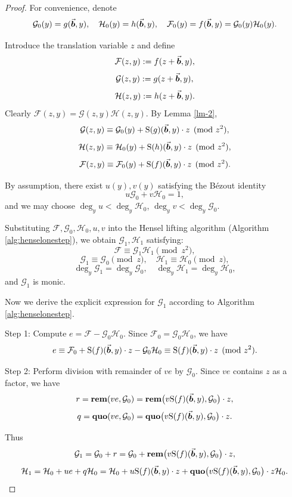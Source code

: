 \documentclass{article}
\numberwithin{equation}{section}
\begin{document}
\begin{proof}
For convenience, denote
\[
\mathcal{G}_0(y) = g(\vec{\boldsymbol{b}}, y), \quad \mathcal{H}_0(y) = h(\vec{\boldsymbol{b}}, y), \quad \mathcal{F}_0(y) = f(\vec{\boldsymbol{b}}, y) = \mathcal{G}_0(y) \mathcal{H}_0(y).
\]

Introduce the translation variable \(z\) and define
\[
\mathcal{F}(z, y) := f(z+\vec{\boldsymbol{b}}, y),
\]
\[
\mathcal{G}(z, y) := g(z+\vec{\boldsymbol{b}}, y),
\]
\[
\mathcal{H}(z, y) := h(z+\vec{\boldsymbol{b}}, y).
\]
Clearly \(\mathcal{F}(z,y) = \mathcal{G}(z,y) \mathcal{H}(z,y)\).
%
By Lemma \ref{lm-2},
\[
\mathcal{G}(z, y) \equiv \mathcal{G}_0(y) + {\rm S}(g)(\vec{\boldsymbol{b}},y) \cdot z \pmod{z^2},
\]
\[
\mathcal{H}(z, y) \equiv \mathcal{H}_0(y) + {\rm S}(h)(\vec{\boldsymbol{b}},y) \cdot z \pmod{z^2},
\]
\[
\mathcal{F}(z, y) \equiv \mathcal{F}_0(y) + {\rm S}(f)(\vec{\boldsymbol{b}},y) \cdot z \pmod{z^2}.
\]

By assumption, there exist \(u(y), v(y)\) satisfying the B\'ezout identity
\[
u \mathcal{G}_0 + v \mathcal{H}_0 = 1,
\]
and we may choose \(\deg_y u < \deg_y \mathcal{H}_0\), \(\deg_y v < \deg_y \mathcal{G}_0\).

Substituting \(\mathcal{F}, \mathcal{G}_0, \mathcal{H}_0, u, v\) into the Hensel lifting algorithm (Algorithm \ref{alg:henselonestep}), we obtain \(\mathcal{G}_1, \mathcal{H}_1\) satisfying:
\[
\mathcal{F} \equiv \mathcal{G}_1 \mathcal{H}_1 \pmod{z^2},
\]
\[
\mathcal{G}_1 \equiv \mathcal{G}_0 \pmod{z}, \quad \mathcal{H}_1 \equiv \mathcal{H}_0 \pmod{z},
\]
\[
\deg_y \mathcal{G}_1 = \deg_y \mathcal{G}_0, \quad \deg_y \mathcal{H}_1 = \deg_y \mathcal{H}_0,
\]
and \(\mathcal{G}_1\) is monic.

Now we derive the explicit expression for \(\mathcal{G}_1\) according to Algorithm \ref{alg:henselonestep}.

Step 1: Compute \(e = \mathcal{F} - \mathcal{G}_0 \mathcal{H}_0\). Since \(\mathcal{F}_0 = \mathcal{G}_0 \mathcal{H}_0\), we have
\[
e \equiv \mathcal{F}_0 + {\rm S}(f)(\vec{\boldsymbol{b}},y) \cdot z - \mathcal{G}_0 \mathcal{H}_0 \equiv {\rm S}(f)(\vec{\boldsymbol{b}},y) \cdot z \pmod{z^2}.
\]

Step 2: Perform division with remainder of \(v e\) by \(\mathcal{G}_0\). Since \(v e\) contains \(z\) as a factor, we have
\[
r = \mathbf{rem}(v e, \mathcal{G}_0) = \mathbf{rem}\bigl(v {\rm S}(f)(\vec{\boldsymbol{b}},y), \mathcal{G}_0\bigr) \cdot z,
\]
\[
q = \mathbf{quo}(v e, \mathcal{G}_0) = \mathbf{quo}\bigl(v {\rm S}(f)(\vec{\boldsymbol{b}},y), \mathcal{G}_0\bigr) \cdot z.
\]

Thus
\[
\mathcal{G}_1 = \mathcal{G}_0 + r = \mathcal{G}_0 + \mathbf{rem}\bigl(v {\rm S}(f)(\vec{\boldsymbol{b}},y), \mathcal{G}_0\bigr) \cdot z,
\]
\[
\mathcal{H}_1 = \mathcal{H}_0 + u e + q \mathcal{H}_0 = \mathcal{H}_0 + u {\rm S}(f)(\vec{\boldsymbol{b}},y) \cdot z + \mathbf{quo}\bigl(v {\rm S}(f)(\vec{\boldsymbol{b}},y), \mathcal{G}_0\bigr) \cdot z \mathcal{H}_0.
\]


\end{proof}
\end{document}
